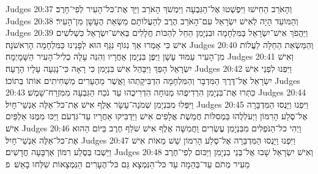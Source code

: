 Judges 20:37	וְהָאֹרֵב הֵחִישׁוּ וַיִּפְשְׁטוּ אֶל־הַגִּבְעָה וַיִּמְשֹׁךְ הָאֹרֵב וַיַּךְ אֶת־כּל־הָעִיר לְפִי־חָרֶב׃
Judges 20:38	וְהַמּוֹעֵד הָיָה לְאִישׁ יִשְׂרָאֵל עִם־הָאֹרֵב הֶרֶב לְהַעֲלוֹתָם מַשְׂאַת הֶעָשָׁן מִן־הָעִיר׃
Judges 20:39	וַיַּהֲפֹךְ אִישׁ־יִשְׂרָאֵל בַּמִּלְחָמָה וּבִנְיָמִן הֵחֵל לְהַכּוֹת חֲלָלִים בְּאִישׁ־יִשְׂרָאֵל כִּשְׁלֹשִׁים אִישׁ כִּי אָמְרוּ אַךְ נִגּוֹף נִגָּף הוּא לְפָנֵינוּ כַּמִּלְחָמָה הָרִאשֹׁנָה׃
Judges 20:40	וְהַמַּשְׂאֵת הֵחֵלָּה לַעֲלוֹת מִן־הָעִיר עַמּוּד עָשָׁן וַיִּפֶן בִּנְיָמִן אַחֲרָיו וְהִנֵּה עָלָה כְלִיל־הָעִיר הַשָּׁמָיְמָה׃
Judges 20:41	וְאִישׁ יִשְׂרָאֵל הָפַךְ וַיִּבָּהֵל אִישׁ בִּנְיָמִן כִּי רָאָה כִּי־נָגְעָה עָלָיו הָרָעָה׃
Judges 20:42	וַיִּפְנוּ לִפְנֵי אִישׁ יִשְׂרָאֵל אֶל־דֶּרֶךְ הַמִּדְבָּר וְהַמִּלְחָמָה הִדְבִּיקָתְהוּ וַאֲשֶׁר מֵהֶעָרִים מַשְׁחִיתִים אוֹתוֹ בְּתוֹכוֹ׃
Judges 20:43	כִּתְּרוּ אֶת־בִּנְיָמִן הִרְדִיפֻהוּ מְנוּחָה הִדְרִיכֻהוּ עַד נֹכַח הַגִּבְעָה מִמִּזְרַח־שָׁמֶשׁ׃
Judges 20:44	וַיִּפְּלוּ מִבִּנְיָמִן שְׁמֹנָה־עָשָׂר אֶלֶף אִישׁ אֶת־כּל־אֵלֶּה אַנְשֵׁי־חָיִל׃
Judges 20:45	וַיִּפְנוּ וַיָּנֻסוּ הַמִּדְבָּרָה אֶל־סֶלַע הָרִמּוֹן וַיְעֹלְלֻהוּ בַּמְסִלּוֹת חֲמֵשֶׁת אֲלָפִים אִישׁ וַיַּדְבִּיקוּ אַחֲרָיו עַד־גִּדְעֹם וַיַּכּוּ מִמֶּנּוּ אַלְפַּיִם אִישׁ׃
Judges 20:46	וַיְהִי כל־הַנֹּפְלִים מִבִּנְיָמִן עֶשְׂרִים וַחֲמִשָּׁה אֶלֶף אִישׁ שֹׁלֵף חֶרֶב בַּיּוֹם הַהוּא אֶת־כּל־אֵלֶּה אַנְשֵׁי־חָיִל׃
Judges 20:47	וַיִּפְנוּ וַיָּנֻסוּ הַמִּדְבָּרָה אֶל־סֶלַע הָרִמּוֹן שֵׁשׁ מֵאוֹת אִישׁ וַיֵּשְׁבוּ בְּסֶלַע רִמּוֹן אַרְבָּעָה חֳדָשִׁים׃
Judges 20:48	וְאִישׁ יִשְׂרָאֵל שָׁבוּ אֶל־בְּנֵי בִנְיָמִן וַיַּכּוּם לְפִי־חֶרֶב מֵעִיר מְתֹם עַד־בְּהֵמָה עַד כּל־הַנִּמְצָא גַּם כּל־הֶעָרִים הַנִּמְצָאוֹת שִׁלְּחוּ בָאֵשׁ׃ {פ}
